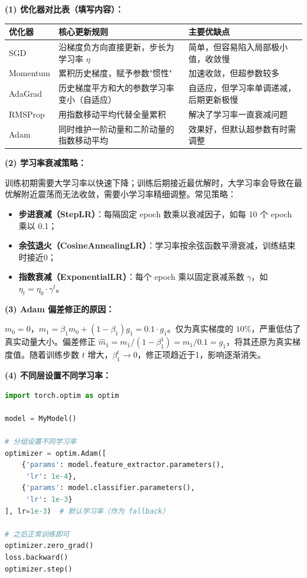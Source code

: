 \documentclass[a4paper,11pt]{ctexart}
\begin{document}
\begin{solutionbox}[参考答案与详细解析]
    \textbf{(1) 优化器对比表（填写内容）：}

    \begin{center}
    \begin{tabular}{p{2.0cm} p{5.0cm} p{4.5cm}}
        \toprule
        优化器 & 核心更新规则 & 主要优缺点 \\
        \midrule
        SGD & 沿梯度负方向直接更新，步长为学习率 $\eta$ & 简单，但容易陷入局部极小值，收敛慢 \\[1em]
        Momentum & 累积历史梯度，赋予参数"惯性" & 加速收敛，但超参数较多 \\[1em]
        AdaGrad & 历史梯度平方和大的参数学习率变小（自适应） & 自适应，但学习率单调递减，后期更新极慢 \\[1em]
        RMSProp & 用指数移动平均代替全量累积 & 解决了学习率一直衰减问题 \\[1em]
        Adam & 同时维护一阶动量和二阶动量的指数移动平均 & 效果好，但默认超参数有时需调整 \\
        \bottomrule
    \end{tabular}
    \end{center}

    \textbf{(2) 学习率衰减策略：}

    训练初期需要大学习率以快速下降；训练后期接近最优解时，大学习率会导致在最优解附近震荡而无法收敛，需要小学习率精细调整。常见策略：
    \begin{itemize}
        \item \textbf{步进衰减（StepLR）}：每隔固定 epoch 数乘以衰减因子，如每 10 个 epoch 乘以 0.1；
        \item \textbf{余弦退火（CosineAnnealingLR）}：学习率按余弦函数平滑衰减，训练结束时接近0；
        \item \textbf{指数衰减（ExponentialLR）}：每个 epoch 乘以固定衰减系数 $\gamma$，如 $\eta_t = \eta_0 \cdot \gamma^t$。
    \end{itemize}

    \textbf{(3) Adam 偏差修正的原因：}

    $m_0 = 0$，$m_1 = \beta_1 m_0 + (1-\beta_1) g_1 = 0.1 \cdot g_1$。仅为真实梯度的 $10\%$，严重低估了真实动量大小。偏差修正 $\hat{m}_1 = m_1 / (1-\beta_1^1) = m_1 / 0.1 = g_1$，将其还原为真实梯度值。随着训练步数 $t$ 增大，$\beta_1^t \to 0$，修正项趋近于1，影响逐渐消失。

    \textbf{(4) 不同层设置不同学习率：}

    \begin{lstlisting}[language=Python]
import torch.optim as optim

model = MyModel()

# 分组设置不同学习率
optimizer = optim.Adam([
    {'params': model.feature_extractor.parameters(),
     'lr': 1e-4},
    {'params': model.classifier.parameters(),
     'lr': 1e-3}
], lr=1e-3)  # 默认学习率（作为 fallback）

# 之后正常训练即可
optimizer.zero_grad()
loss.backward()
optimizer.step()
    \end{lstlisting}
\end{solutionbox}
\end{document}
